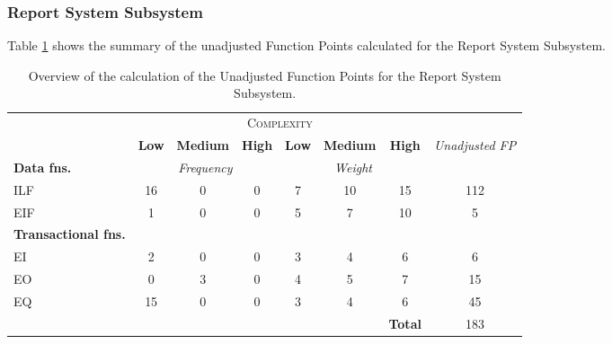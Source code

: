 \subsubsection{Report System Subsystem} 
Table \ref{tbl_RSS_UFP} shows the summary of the unadjusted Function Points calculated for the Report System Subsystem.
\begin{table}[hbtp]
\centering
\begin{tabular}{|l|c|c|c|c|c|c|c|}
\cline{2-7}
\multicolumn{1}{c}{} & \multicolumn{6}{|c|}{\textsc{Complexity}} & \multicolumn{1}{c}{}  \\ \cline{2-8}
\multicolumn{1}{c|}{} & \textbf{Low} & \textbf{Medium} & \textbf{High} & \textbf{Low} & \textbf{Medium} & \textbf{High} & \multirow{2}{*}{\textit{Unadjusted FP}} \\ \cline{1-7}
\textbf{Data fns.} & \multicolumn{3}{|c|}{\textit{Frequency}} &  \multicolumn{3}{|c|}{\textit{Weight}} & \\ \hline
ILF 	& 16 & 0 & 0 & 7 & 10 & 15 & 112 	\\ \hline
EIF 	& 1  & 0 & 0 & 5 & 7  & 10 & 5		\\ \hline
\textbf{Transactional fns.} & \multicolumn{7}{|c|}{} \\ \hline
EI 		& 2  & 0 & 0 & 3 & 4  & 6  & 6 		\\ \hline
EO 		& 0  & 3 & 0 & 4 & 5  & 7  & 15		\\ \hline
EQ		& 15 & 0 & 0 & 3 & 4  & 6  & 45		\\ \hline
\multicolumn{6}{c|}{} & \textbf{Total} & 183 \\ \cline{7-8}
\end{tabular}
\caption{Overview of the calculation of the Unadjusted Function Points for the Report System Subsystem.}
\label{tbl_RSS_UFP}
\end{table}

